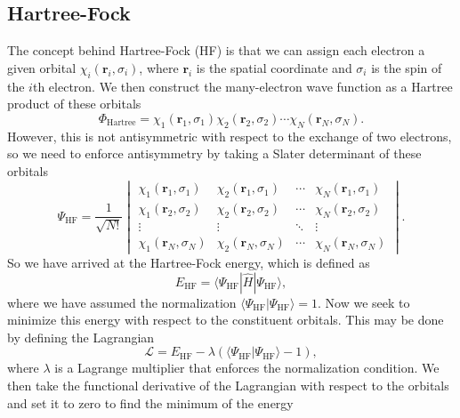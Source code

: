 \documentclass[12pt]{caltech_thesis}
\begin{document}
\subsection{Hartree-Fock\autocite{szabo_modern_2012}}
\label{sec:hf}
The concept behind Hartree-Fock (HF) is that we can assign each electron a given orbital $\chi_{i} (\mathbf{r}_{i}, \sigma_{i})$, where $\mathbf{r}_{i}$ is the spatial coordinate and $\sigma_{i}$ is the spin of the $i$th electron. We then construct the many-electron wave function as a Hartree product of these orbitals
\begin{equation}
    \Phi _{\mathrm{Hartree}} = \chi _1(\mathbf{r}_1, \sigma_1) \chi _2(\mathbf{r}_2, \sigma_2) \cdots \chi _N(\mathbf{r}_N, \sigma_N).
\end{equation}
However, this is not antisymmetric with respect to the exchange of two electrons, so we need to enforce antisymmetry by taking a Slater determinant of these orbitals
\begin{equation}
    \Psi _{\mathrm{HF}} = \frac{1}{\sqrt{N!}} \begin{vmatrix}
    \chi _1(\mathbf{r}_1, \sigma_1) & \chi _2(\mathbf{r}_1, \sigma_1) & \cdots & \chi _N(\mathbf{r}_1, \sigma_1) \\
    \chi _1(\mathbf{r}_2, \sigma_2) & \chi _2(\mathbf{r}_2, \sigma_2) & \cdots & \chi _N(\mathbf{r}_2, \sigma_2) \\
    \vdots & \vdots & \ddots & \vdots \\
    \chi _1(\mathbf{r}_N, \sigma_N) & \chi _2(\mathbf{r}_N, \sigma_N) & \cdots & \chi _N(\mathbf{r}_N, \sigma_N) 
    \end{vmatrix}.
\end{equation}
So we have arrived at the Hartree-Fock energy, which is defined as
\begin{equation}
    E_{\mathrm{HF}} = \langle \Psi _{\mathrm{HF}} | \hat{H} | \Psi _{\mathrm{HF}} \rangle,
\end{equation}
where we have assumed the normalization $\langle \Psi _{\mathrm{HF}} | \Psi _{\mathrm{HF}} \rangle = 1$.
Now we seek to minimize this energy with respect to the constituent orbitals. This may be done by defining the Lagrangian
\begin{equation}
    \mathcal{L} = E_{\mathrm{HF}} - \lambda \left( \langle \Psi _{\mathrm{HF}} | \Psi _{\mathrm{HF}} \rangle - 1 \right),
\end{equation}
where $\lambda$ is a Lagrange multiplier that enforces the normalization condition. We then take the functional derivative of the Lagrangian with respect to the orbitals and set it to zero to find the minimum of the energy
\end{document}
